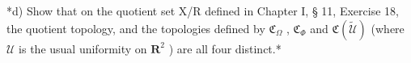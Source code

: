*d) Show that on the quotient set X/R defined in Chapter I, § 11, Exercise 18, the quotient topology, and the topologies defined by \(\mathfrak{C}_{\Omega}\) , \(\mathfrak{C}_{\Phi}\) and \(\mathfrak{C}(\tilde{\mathcal{U}})\) (where \(\mathcal{U}\) is the usual uniformity on \(\mathbf{R}^2\) ) are all four distinct.*

